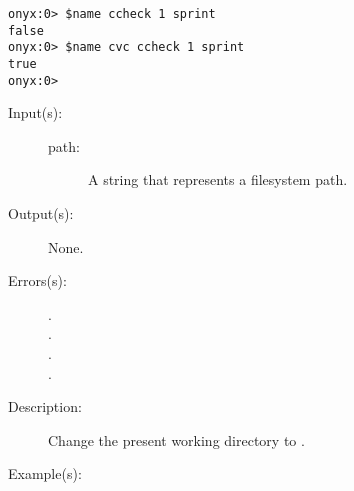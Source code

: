 \begin{description}
\begin{description}
\begin{verbatim}
onyx:0> $name ccheck 1 sprint
false
onyx:0> $name cvc ccheck 1 sprint
true
onyx:0>
		\end{verbatim}
	\end{description}
\label{systemdict:cd}
\item[{\onyxop{path}{cd}{--}}: ]
	\begin{description}\item[]
	\item[Input(s): ]
		\begin{description}\item[]
		\item[path: ]
			A string that represents a filesystem path.
		\end{description}
	\item[Output(s): ] None.
	\item[Errors(s): ]
		\begin{description}\item[]
		\item[.]
		\item[.]
		\item[.]
		\item[.]
		\end{description}
	\item[Description: ]
		Change the present working directory to .
	\item[Example(s): ]\begin{verbatim}


\end{verbatim}
\end{description}
\end{description}
